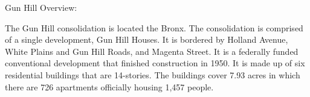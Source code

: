 Gun Hill Overview:   

  

The Gun Hill consolidation is located the Bronx. The consolidation is comprised of a single development, Gun Hill Houses. It is bordered by Holland Avenue, White Plains and Gun Hill Roads, and Magenta Street.  It is a federally funded conventional development that finished construction in 1950. It is made up of six residential buildings that are 14-stories. The buildings cover 7.93  acres in which there are 726 apartments officially housing 1,457 people.